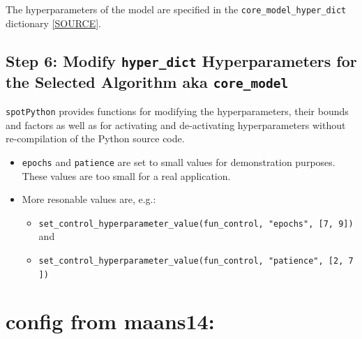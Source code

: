\documentclass[
  letterpaper,
  DIV=11,
  numbers=noendperiod]{scrreprt}
\providecommand{\tightlist}{%
  \setlength{\itemsep}{0pt}\setlength{\parskip}{0pt}}\usepackage{longtable,booktabs,array}
\begin{document}
The hyperparameters of the model are specified in the
\texttt{core\_model\_hyper\_dict} dictionary
\href{https://github.com/sequential-parameter-optimization/spotPython/blob/main/src/spotPython/hyperdict/light_hyper_dict.json}{{[}SOURCE{]}}.

\section{\texorpdfstring{Step 6: Modify \texttt{hyper\_dict}
Hyperparameters for the Selected Algorithm aka
\texttt{core\_model}}{Step 6: Modify hyper\_dict Hyperparameters for the Selected Algorithm aka core\_model}}\label{sec-modification-of-hyperparameters-31}

\texttt{spotPython} provides functions for modifying the
hyperparameters, their bounds and factors as well as for activating and
de-activating hyperparameters without re-compilation of the Python
source code.

\begin{tcolorbox}[enhanced jigsaw, left=2mm, opacitybacktitle=0.6, leftrule=.75mm, toptitle=1mm, opacityback=0, colback=white, rightrule=.15mm, colframe=quarto-callout-caution-color-frame, title=\textcolor{quarto-callout-caution-color}{\faFire}\hspace{0.5em}{Caution: Small number of epochs for demonstration purposes}, toprule=.15mm, coltitle=black, bottomrule=.15mm, bottomtitle=1mm, colbacktitle=quarto-callout-caution-color!10!white, titlerule=0mm, breakable, arc=.35mm]

\begin{itemize}
\tightlist
\item
  \texttt{epochs} and \texttt{patience} are set to small values for
  demonstration purposes. These values are too small for a real
  application.
\item
  More resonable values are, e.g.:

  \begin{itemize}
  \tightlist
  \item
    \texttt{set\_control\_hyperparameter\_value(fun\_control,\ "epochs",\ {[}7,\ 9{]})}
    and
  \item
    \texttt{set\_control\_hyperparameter\_value(fun\_control,\ "patience",\ {[}2,\ 7{]})}
  \end{itemize}
\end{itemize}

\end{tcolorbox}

\chapter{config from maans14:}\label{config-from-maans14}
\end{document}
